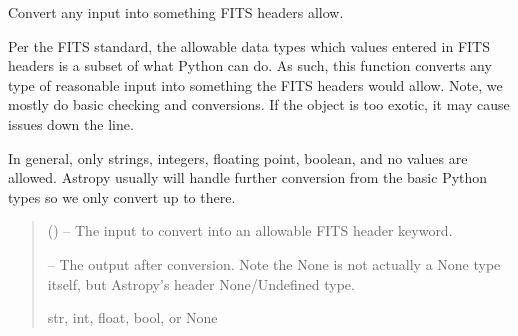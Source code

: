 \documentclass[letterpaper,11pt,english]{sphinxmanual}
\begin{document}
\begin{savenotes}\begin{fulllineitems}
\label{\detokenize{code/lezargus.library.conversion:lezargus.library.conversion.convert_to_allowable_fits_header_data_types}}
\pysigstartsignatures
{}
\pysigstopsignatures
\sphinxAtStartPar
Convert any input into something FITS headers allow.

\sphinxAtStartPar
Per the FITS standard, the allowable data types which values entered in
FITS headers is a subset of what Python can do. As such, this function
converts any type of reasonable input into something the FITS headers
would allow. Note, we mostly do basic checking and conversions. If the
object is too exotic, it may cause issues down the line.

\sphinxAtStartPar
In general, only strings, integers, floating point, boolean, and no values
are allowed. Astropy usually will handle further conversion from the basic
Python types so we only convert up to there.
\begin{quote}\begin{description}
\sphinxAtStartPar
{} () – The input to convert into an allowable FITS header keyword.

\sphinxAtStartPar
{} – The output after conversion. Note the None is not actually a None
type itself, but Astropy’s header None/Undefined type.

\sphinxAtStartPar
str, int, float, bool, or None

\end{description}\end{quote}

\end{fulllineitems}\end{savenotes}

\end{document}

